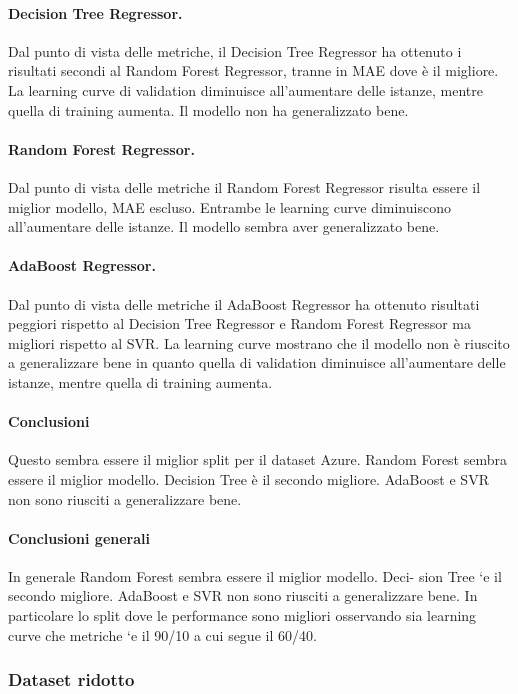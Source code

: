 \paragraph{\textbf{Decision Tree Regressor}.}
Dal punto di vista delle metriche, il Decision Tree Regressor ha ottenuto i risultati secondi al Random Forest Regressor, tranne in MAE dove è il migliore.
La learning curve di validation diminuisce all'aumentare delle istanze, mentre quella di training aumenta. Il modello non ha generalizzato bene.
\paragraph{\textbf{Random Forest Regressor}.}
Dal punto di vista delle metriche il Random Forest Regressor risulta essere il miglior modello, MAE escluso. Entrambe le learning curve diminuiscono all'aumentare delle istanze. Il modello sembra aver generalizzato bene.
\paragraph{\textbf{AdaBoost Regressor}.}
Dal punto di vista delle metriche il AdaBoost Regressor ha ottenuto risultati peggiori rispetto al Decision Tree Regressor e Random Forest Regressor ma migliori rispetto al SVR.
La learning curve mostrano che il modello non è riuscito a generalizzare bene in quanto quella di validation diminuisce all'aumentare delle istanze, mentre quella di training aumenta.

\paragraph{\textbf{Conclusioni}} Questo sembra essere il miglior split per il dataset Azure. Random Forest sembra essere il miglior modello. Decision Tree è il secondo migliore. AdaBoost e SVR non sono riusciti a generalizzare bene.
\newpage

\paragraph{\textbf{Conclusioni generali}}

In generale Random Forest sembra essere il miglior modello. Deci-
sion Tree `e il secondo migliore. AdaBoost e SVR non sono riusciti a generalizzare bene. In
particolare lo split dove le performance sono migliori osservando sia learning curve che metriche
`e il 90/10 a cui segue il 60/40.



\subsubsection{Dataset ridotto}

